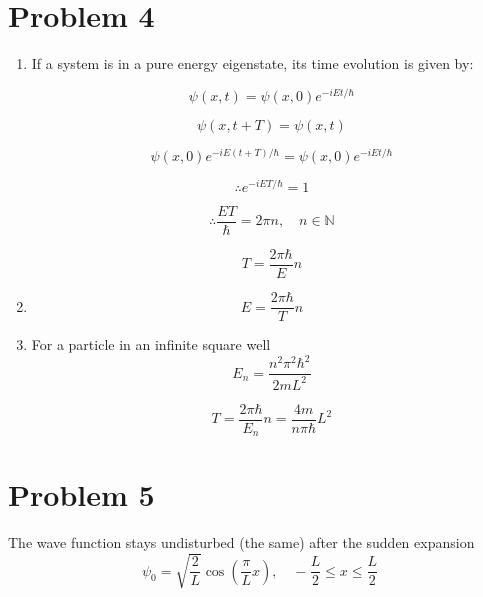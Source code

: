 \documentclass[12pt]{article}
\begin{document}
\section{Problem 4}
\begin{enumerate}
    \item
          If a system is in a pure energy eigenstate, its time evolution is given by:

          \[
              \psi(x, t) = \psi(x, 0) e^{-i E t / \hbar}
          \]

          \[
              \psi(x, t + T) = \psi(x, t)
          \]

          \[
              \psi(x, 0) e^{-i E (t+T) / \hbar}  = \psi(x, 0) e^{-i E t / \hbar}
          \]

          \[
              \therefore e^{-i E T / \hbar} = 1
          \]

          \[
              \therefore \frac{E T}{\hbar} = 2 \pi n, \quad n \in \mathbb{N}
          \]

          \[
              T = \frac{2 \pi \hbar}{E} n
          \]

    \item

          \[
              E = \frac{2 \pi \hbar}{T} n
          \]

    \item
          For a particle in an infinite square well
          \[
              E_n = \frac{n^2 \pi^2 \hbar^2}{2m L^2}
          \]

          \[
              T = \frac{2 \pi \hbar}{E_n} n = \frac{4 m}{n \pi \hbar} L^2
          \]

\end{enumerate}

\newpage
\section{Problem 5}
The wave function stays undisturbed (the same) after the sudden expansion
\[
    \psi_0 = \sqrt{\frac{2}{L}}\cos{(\frac{\pi}{L}x)}, \quad -\frac{L}{2} \leq x \leq \frac{L}{2}
\]

\end{document}
